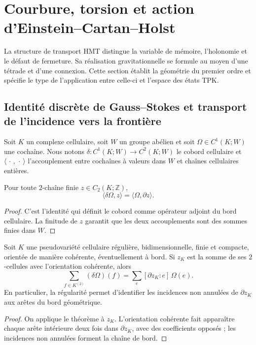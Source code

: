 \section{Courbure, torsion et action d’Einstein--Cartan--Holst}
\label{chap:gravedad-cartan-holst}

La structure de transport HMT distingue la variable de mémoire, l’holonomie et le défaut de fermeture. Sa réalisation gravitationnelle se formule au moyen d’une tétrade et d’une connexion. Cette section établit la géométrie du premier ordre et spécifie le type de l’application entre celle-ci et l’espace des états TPK\@.

\subsection{Identité discrète de Gauss–Stokes et transport de l’incidence vers la frontière}

Soit \(K\) un complexe cellulaire, soit \(W\) un groupe abélien et soit \(\Omega\in C^1(K;W)\) une cochaîne. Nous notons \(\delta:C^1(K;W)\to C^2(K;W)\) le cobord cellulaire et \(\langle\,\cdot\,,\,\cdot\,\rangle\) l’accouplement entre cochaînes à valeurs dans \(W\) et chaînes cellulaires entières.

\begin{theorem}
Pour toute \(2\)-chaîne finie \(z\in C_2(K;\mathbb Z)\),
\[
 \boxed{\langle\delta\Omega,z\rangle
 =\langle\Omega,\partial z\rangle.}
\]
\end{theorem}
\begin{proof}
C’est l’identité qui définit le cobord comme opérateur adjoint du bord cellulaire. La finitude de \(z\) garantit que les deux accouplements sont des sommes finies dans \(W\).
\end{proof}

\begin{corollary}
Soit \(K\) une pseudovariété cellulaire régulière, bidimensionnelle, finie et compacte, orientée de manière cohérente, éventuellement à bord. Si \(z_K\) est la somme de ses \(2\)-cellules avec l’orientation cohérente, alors
\[
 \sum_{f\in K^{(2)}}(\delta\Omega)(f)
 =\sum_e[\partial z_K:e]\,\Omega(e).
\]
En particulier, la régularité permet d’identifier les incidences non annulées de \(\partial z_K\) aux arêtes du bord géométrique.
\end{corollary}
\begin{proof}
On applique le théorème à \(z_K\). L’orientation cohérente fait apparaître chaque arête intérieure deux fois dans \(\partial z_K\), avec des coefficients opposés ; les incidences non annulées forment la chaîne de bord.
\end{proof}

